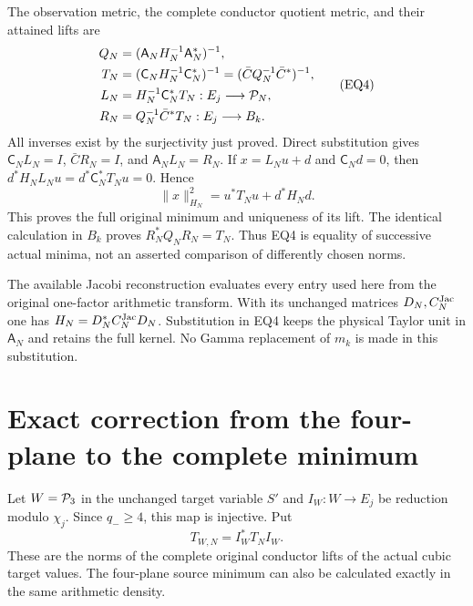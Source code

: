 \documentclass[11pt]{article}
\begin{document}
The observation metric, the complete conductor quotient metric, and
their attained lifts are
\[
 \begin{split}
 Q_N&=(\mathsf A_NH_N^{-1}\mathsf A_N^*)^{-1},\\
 T_N&=(\mathsf C_NH_N^{-1}\mathsf C_N^*)^{-1}
       =(\bar C Q_N^{-1}\bar C^*)^{-1},\\
 L_N&=H_N^{-1}\mathsf C_N^*T_N:E_j\longrightarrow\mathcal P_N,\\
 R_N&=Q_N^{-1}\bar C^*T_N:E_j\longrightarrow B_k.
 \end{split}                                                       \tag{EQ4}
\]
All inverses exist by the surjectivity just proved. Direct substitution
gives $\mathsf C_NL_N=I$, $\bar CR_N=I$, and
$\mathsf A_NL_N=R_N$. If $x=L_Nu+d$ and $\mathsf C_Nd=0$, then
$d^*H_NL_Nu=d^*\mathsf C_N^*T_Nu=0$. Hence
\[
 \|x\|_{H_N}^2=u^*T_Nu+d^*H_Nd.                                  \tag{EQ5}
\]
This proves the full original minimum and uniqueness of its lift.
The identical calculation in $B_k$ proves
$R_N^*Q_NR_N=T_N$. Thus EQ4 is equality of successive actual
minima, not an asserted comparison of differently chosen norms.

The available Jacobi reconstruction \cite{eightmin:JC} evaluates every entry
used here from the original one-factor arithmetic transform. With its
unchanged matrices $D_N,C_N^{\rm Jac}$ one has
$H_N=D_N^*C_N^{\rm Jac}D_N$. Substitution in EQ4 keeps the physical
Taylor unit in $\mathsf A_N$ and retains the full kernel. No Gamma
replacement of $m_k$ is made in this substitution.

\section{Exact correction from the four-plane to the complete minimum}
Let $W=\mathcal P_3$ in the unchanged target variable $S'$ and
$I_W:W\to E_j$ be reduction modulo $\chi_j$. Since $q_-\ge4$,
this map is injective. Put
\[
 T_{W,N}=I_W^*T_NI_W.                                               \tag{EQ6}
\]
These are the norms of the complete original conductor lifts of
the actual cubic target values. The four-plane source minimum can
also be calculated exactly in the same arithmetic density.
\end{document}

